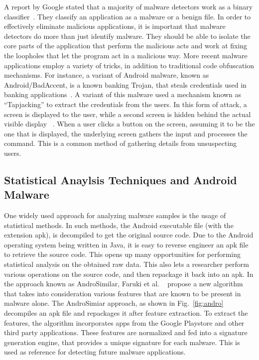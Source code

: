 A report by Google stated that a majority of malware detectors work as a binary classifier~\cite{google}. They classify an application as a malware or a benign file. In order to effectively eliminate malicious applications, it is important that malware detectors do more than just identify malware. They should be able to isolate the core parts of the application that perform the malicious acts and work at fixing the loopholes that let the program act in a malicious way. More recent malware applications employ a variety of tricks, in addition to traditional code obfuscation mechanisms. For instance, a variant of Android malware, known as Android/BadAccent, is a known banking Trojan, that steals credentials used in banking applications~\cite{rasthofer2015}. A variant of this malware used a mechanism known as “Tapjacking” to extract the credentials from the users. In this form of attack, a screen is displayed to the user, while a second screen is hidden behind the actual visible display ~\cite{chen2014peeking}. When a user clicks a button on the screen, assuming it to be the one that is displayed, the underlying screen gathers the input and processes the command.  This is a common method of gathering details from unsuspecting users.


\subsection{Statistical Anaylsis Techniques and Android Malware}

One widely used approach for analyzing malware samples is the usage of statistical methods. In such methods, the Android executable file (with the extension apk), is decompiled to get the original source code. Due to the Android operating system being written in Java, it is easy to reverse engineer an apk file to retrieve the source code. This opens up many opportunities for performing statistical analysis on the obtained raw data. This also lets a researcher perform various operations on the source code, and then repackage it back into an apk. In the approach known as AndroSimilar, Faruki et al. ~\cite{androsimilar} propose a new algorithm that takes into consideration various features that are known to be present in malware alone. The AndroSimiar approach, as shown in Fig.~\ref{fig:andro} decompiles an apk file and repackages it after feature extraction. To extract the features, the algorithm incorporates apps from the Google Playstore and other third party applications. These features are normalized and fed into a signature generation engine, that provides a unique signature for each malware. This is used as reference for detecting future malware applications.


